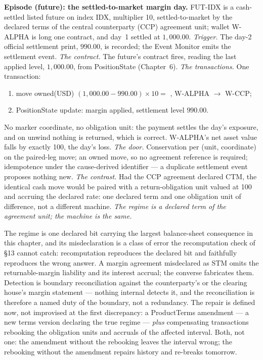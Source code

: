 \medskip\noindent\textbf{Episode (future): the settled-to-market margin day.}
FUT-IDX is a cash-settled listed future on index IDX, multiplier 10,
settled-to-market by the declared terms of the central counterparty (CCP)
agreement unit; wallet W-ALPHA is long one contract, and day~1 settled at
$1{,}000.00$.
\emph{Trigger.} The day-2 official settlement print, $990.00$, is recorded;
the Event Monitor emits the settlement event.
\emph{The contract.} The future's contract fires, reading the last applied
level, $1{,}000.00$, from PositionState (Chapter~6).
\emph{The transactions.} One transaction:
\begin{enumerate}[label=(\arabic*),nosep]
\item move owned(USD) $(1{,}000.00-990.00)\times 10 = $ , W-ALPHA
$\to$ W-CCP;
\item PositionState update: margin applied, settlement level $990.00$.
\end{enumerate}
No marker coordinate, no obligation unit: the payment settles the day's
exposure, and on unwind nothing is returned, which is correct. W-ALPHA's net
asset value falls by exactly 100, the day's loss.
\emph{The door.} Conservation per (unit, coordinate) on the paired-leg move;
an owned move, so no agreement reference is required; idempotence under the
cause-derived identifier --- a duplicate settlement event proposes nothing
new.
\emph{The contrast.} Had the CCP agreement declared CTM, the identical cash
move would be paired with a return-obligation unit valued at 100 and accruing
the declared rate: one declared term and one obligation unit of difference,
not a different machine.
\emph{The regime is a declared term of the agreement unit; the machine is the
same.}

\medskip
The regime is one declared bit carrying the largest balance-sheet consequence
in this chapter, and its misdeclaration is a class of error the recomputation
check of \S13 cannot catch: recomputation reproduces the declared bit and
faithfully reproduces the wrong answer. A margin agreement misdeclared as STM
omits the returnable-margin liability and its interest accrual; the converse
fabricates them. Detection is boundary reconciliation against the
counterparty's or the clearing house's margin statement --- nothing internal
detects it, and the reconciliation is therefore a named duty of the boundary,
not a redundancy. The repair is defined now, not improvised at the first
discrepancy: a ProductTerms amendment --- a new terms version declaring the
true regime --- \emph{plus} compensating transactions rebooking the obligation
units and accruals of the affected interval. Both, not one: the amendment
without the rebooking leaves the interval wrong; the rebooking without the
amendment repairs history and re-breaks tomorrow.


